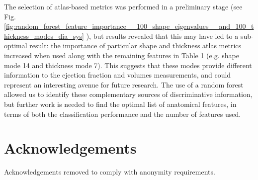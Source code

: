 \documentclass[journal]{IEEEtran}
\begin{document}
The selection of atlas-based metrics was performed in a preliminary stage (see Fig. \ref{fig:random_forest_feature_importance__100_shape_eigenvalues__and_100_thickness_modes_dia_sys} ), but results revealed that this may have led to a sub-optimal result: the importance of particular shape and thickness atlas metrics increased when used along with the remaining features in Table 1 (e.g. shape mode 14 and thickness mode 7). This suggests that these modes provide different information to the ejection fraction and volumes measurements, and could represent an interesting avenue for future research. The use of a random forest allowed us to identify these complementary sources of discriminative information, but further work is needed to find the optimal list of anatomical features, in terms of both the classification performance and the number of features used.


\section{Acknowledgements}
Acknowledgements removed to comply with anonymity requirements.



\end{document}

